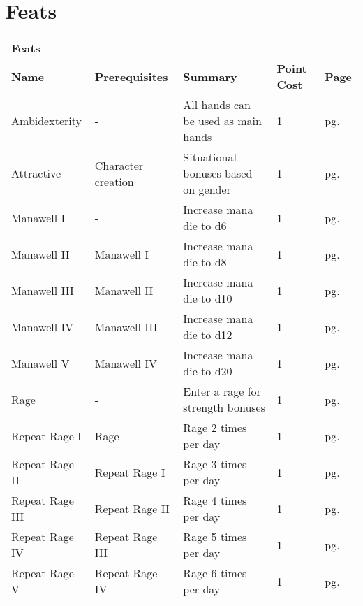 \chapter{Feats}\label{feats}

\begin{multicols*}{2}
    \begin{table*}[ht]
        \unclassedrowcolors
        \begin{tabularx}{\textwidth}{l X X l l}
            \multicolumn{5}{l}{\textbf{Feats}} \\
            \textbf{Name} & \textbf{Prerequisites} & \textbf{Summary} & \textbf{Point Cost} & \textbf{Page} \\
            Ambidexterity & - & All hands can be used as main hands & 1 & pg. \pageref{feat:ambidexterity} \\
            Attractive & Character creation & Situational bonuses based on gender & 1 & pg. \pageref{feat:attractive} \\
            Manawell I & - & Increase mana die to d6 & 1 & pg. \pageref{feat:manawell1} \\
            \quad Manawell II & Manawell I & Increase mana die to d8 & 1 & pg. \pageref{feat:manawell2} \\
            \quad Manawell III & Manawell II & Increase mana die to d10 & 1 & pg. \pageref{feat:manawell3} \\
            \quad Manawell IV & Manawell III & Increase mana die to d12 & 1 & pg. \pageref{feat:manawell4} \\
            \quad Manawell V & Manawell IV & Increase mana die to d20 & 1 & pg. \pageref{feat:manawell5} \\
            Rage & - & Enter a rage for strength bonuses & 1 & pg. \pageref{feat:rage} \\
            \quad Repeat Rage I & Rage & Rage 2 times per day & 1 & pg. \pageref{feat:repeatrage1} \\
            \quad Repeat Rage II & Repeat Rage I & Rage 3 times per day & 1 & pg. \pageref{feat:repeatrage2} \\
            \quad Repeat Rage III & Repeat Rage II & Rage 4 times per day & 1 & pg. \pageref{feat:repeatrage3} \\
            \quad Repeat Rage IV & Repeat Rage III & Rage 5 times per day & 1 & pg. \pageref{feat:repeatrage4} \\
            \quad Repeat Rage V & Repeat Rage IV & Rage 6 times per day & 1 & pg. \pageref{feat:repeatrage5} \\

\end{tabularx}
\end{table*}
\end{multicols*}

